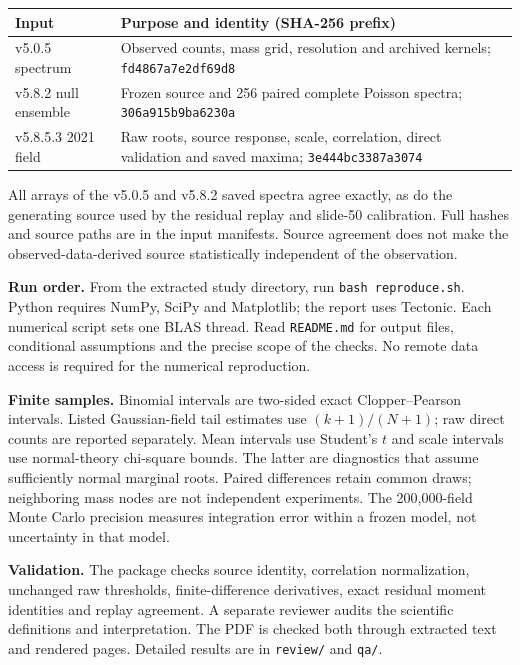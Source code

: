 \documentclass[10pt]{article}
\begin{document}
\begin{center}\small
\begin{tabularx}{\linewidth}{lX}
\toprule
Input & Purpose and identity (SHA-256 prefix)\\
\midrule
v5.0.5 spectrum & Observed counts, mass grid, resolution and archived kernels; \texttt{fd4867a7e2df69d8}\\
v5.8.2 null ensemble & Frozen source and 256 paired complete Poisson spectra; \texttt{306a915b9ba6230a}\\
v5.8.5.3 2021 field & Raw roots, source response, scale, correlation, direct validation and saved maxima; \texttt{3e444bc3387a3074}\\
\bottomrule
\end{tabularx}
\end{center}
All arrays of the v5.0.5 and v5.8.2 saved spectra agree exactly, as do the
generating source used by the residual replay and slide-50 calibration.
Full hashes and source paths are in the input manifests. Source agreement
does not make the observed-data-derived source statistically independent
of the observation.

\textbf{Run order.} From the extracted study directory, run
\texttt{bash reproduce.sh}. Python requires NumPy, SciPy and Matplotlib;
the report uses Tectonic. Each numerical script sets one BLAS thread.
Read \texttt{README.md} for output files, conditional assumptions and the
precise scope of the checks. No remote data access is required for the
numerical reproduction.

\textbf{Finite samples.} Binomial intervals are two-sided exact
Clopper--Pearson intervals. Listed Gaussian-field tail estimates use
$(k+1)/(N+1)$; raw direct counts are reported separately. Mean intervals
use Student's $t$ and scale intervals use normal-theory chi-square bounds.
The latter are diagnostics that assume sufficiently normal marginal roots.
Paired differences retain common draws; neighboring mass nodes are not
independent experiments. The 200,000-field Monte Carlo precision measures
integration error within a frozen model, not uncertainty in that model.

\textbf{Validation.} The package checks source identity, correlation
normalization, unchanged raw thresholds, finite-difference derivatives,
exact residual moment identities and replay agreement. A separate reviewer
audits the scientific definitions and interpretation. The PDF is checked
both through extracted text and rendered pages. Detailed results are in
\texttt{review/} and \texttt{qa/}.
\end{document}
